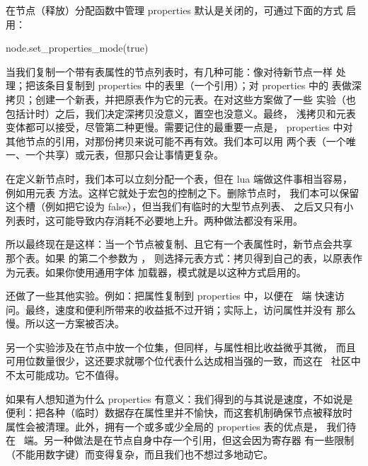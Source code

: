 在节点（释放）分配函数中管理 properties 默认是关闭的，可通过下面的方式
启用：

\begin{typing}
node.set_properties_mode(true)
\end{typing}

当我们复制一个带有表属性的节点列表时，有几种可能：像对待新节点一样
处理；把该条目复制到 properties 中的表里（一个引用）；对 properties 中的
表做深拷贝；创建一个新表，并把原表作为它的元表。在对这些方案做了一些
实验（也包括计时）之后，我们决定深拷贝没意义，置空也没意义。最终，
浅拷贝和元表变体都可以接受，尽管第二种更慢。需要记住的最重要一点是，
properties 中对其他节点的引用，对那份拷贝来说可能不再有效。我们本可以用
两个表（一个唯一、一个共享）或元表，但那只会让事情更复杂。

在定义新节点时，我们本可以立刻分配一个表，但在 lua 端做这件事相当容易，
例如用元表  方法。这样它就处于宏包的控制之下。删除节点时，
我们本可以保留这个槽（例如把它设为 false），但当我们有临时的大型节点列表、
之后又只有小列表时，这可能导致内存消耗不必要地上升。两种做法都没有采用。

所以最终现在是这样：当一个节点被复制、且它有一个表属性时，新节点会共享
那个表。如果  的第二个参数为 ，
则选择元表方式：拷贝得到自己的表，以原表作为元表。如果你使用通用字体
加载器，模式就是以这种方式启用的。

还做了一些其他实验。例如：把属性复制到 properties 中，以便在 \LUA\ 端
快速访问。最终，速度和便利所带来的收益抵不过开销；实际上，访问属性并没有
那么慢。所以这一方案被否决。

另一个实验涉及在节点中放一个位集，但同样，与属性相比收益微乎其微，
而且可用位数量很少，这还要求就哪个位代表什么达成相当强的一致，而这在
\TEX\ 社区中不太可能成功。它不值得。

如果有人想知道为什么 properties 有意义：我们得到的与其说是速度，不如说是
便利：把各种（临时）数据存在属性里并不愉快，而这套机制确保节点被释放时
属性会被清理。此外，拥有一个或多或少全局的 properties 表的优点是，
我们待在 \LUA\ 端。另一种做法是在节点自身中存一个引用，但这会因为寄存器
有一些限制（不能用数字键）而变得复杂，而且我们也不想过多地动它。
